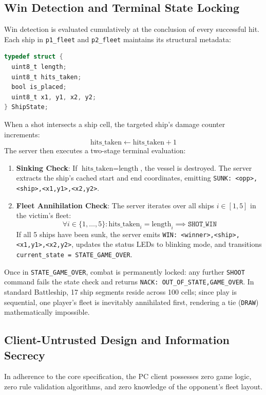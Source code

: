 \subsection{Win Detection and Terminal State Locking}
Win detection is evaluated cumulatively at the conclusion of every successful hit. Each ship in \texttt{p1\_fleet} and \texttt{p2\_fleet} maintains its structural metadata:
\begin{lstlisting}[language=C]
typedef struct {
  uint8_t length;
  uint8_t hits_taken;
  bool is_placed;
  uint8_t x1, y1, x2, y2;
} ShipState;
\end{lstlisting}
When a shot intersects a ship cell, the targeted ship's damage counter increments:
\begin{equation}
\text{hits\_taken} \leftarrow \text{hits\_taken} + 1
\end{equation}
The server then executes a two-stage terminal evaluation:
\begin{enumerate}
    \item \textbf{Sinking Check}: If $\text{hits\_taken} = \text{length}$, the vessel is destroyed. The server extracts the ship's cached start and end coordinates, emitting \texttt{SUNK: <opp>,<ship>,<x1,y1>,<x2,y2>}.
    \item \textbf{Fleet Annihilation Check}: The server iterates over all ships $i \in [1, 5]$ in the victim's fleet:
    \begin{equation}
    \forall i \in \{1,\ldots,5\}: \text{hits\_taken}_i = \text{length}_i \implies \texttt{SHOT\_WIN}
    \end{equation}
    If all 5 ships have been sunk, the server emits \texttt{WIN: <winner>,<ship>,<x1,y1>,<x2,y2>}, updates the status LEDs to blinking mode, and transitions \texttt{current\_state = STATE\_GAME\_OVER}.
\end{enumerate}

Once in \texttt{STATE\_GAME\_OVER}, combat is permanently locked: any further \texttt{SHOOT} command fails the state check and returns \texttt{NACK: OUT\_OF\_STATE,GAME\_OVER}. In standard Battleship, 17 ship segments reside across 100 cells; since play is sequential, one player's fleet is inevitably annihilated first, rendering a tie (\texttt{DRAW}) mathematically impossible.

\subsection{Client-Untrusted Design and Information Secrecy}
In adherence to the core specification, the PC client possesses zero game logic, zero rule validation algorithms, and zero knowledge of the opponent's fleet layout. 

